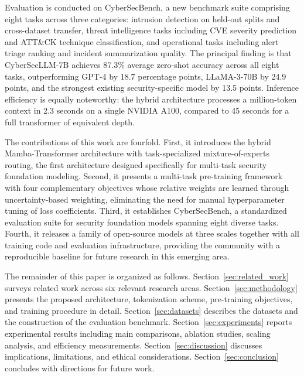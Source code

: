\documentclass[journal]{IEEEtran}
\newcommand{\modelname}{CyberSecLLM}
\newcommand{\benchname}{CyberSecBench}
\begin{document}
Evaluation is conducted on \benchname{}, a new benchmark suite comprising eight tasks across three categories: intrusion detection on held-out splits and cross-dataset transfer, threat intelligence tasks including CVE severity prediction and ATT\&CK technique classification, and operational tasks including alert triage ranking and incident summarization quality. The principal finding is that \modelname{}-7B achieves 87.3\% average zero-shot accuracy across all eight tasks, outperforming GPT-4 by 18.7 percentage points, LLaMA-3-70B by 24.9 points, and the strongest existing security-specific model by 13.5 points. Inference efficiency is equally noteworthy: the hybrid architecture processes a million-token context in 2.3 seconds on a single NVIDIA A100, compared to 45 seconds for a full transformer of equivalent depth.

The contributions of this work are fourfold. First, it introduces the hybrid Mamba-Transformer architecture with task-specialized mixture-of-experts routing, the first architecture designed specifically for multi-task security foundation modeling. Second, it presents a multi-task pre-training framework with four complementary objectives whose relative weights are learned through uncertainty-based weighting, eliminating the need for manual hyperparameter tuning of loss coefficients. Third, it establishes \benchname{}, a standardized evaluation suite for security foundation models spanning eight diverse tasks. Fourth, it releases a family of open-source models at three scales together with all training code and evaluation infrastructure, providing the community with a reproducible baseline for future research in this emerging area.

The remainder of this paper is organized as follows. Section~\ref{sec:related_work} surveys related work across six relevant research areas. Section~\ref{sec:methodology} presents the proposed architecture, tokenization scheme, pre-training objectives, and training procedure in detail. Section~\ref{sec:datasets} describes the datasets and the construction of the evaluation benchmark. Section~\ref{sec:experiments} reports experimental results including main comparisons, ablation studies, scaling analysis, and efficiency measurements. Section~\ref{sec:discussion} discusses implications, limitations, and ethical considerations. Section~\ref{sec:conclusion} concludes with directions for future work.

\end{document}
